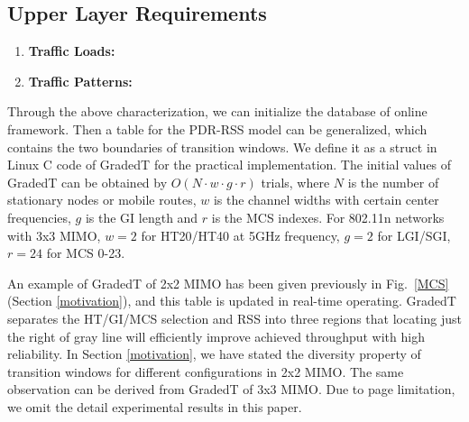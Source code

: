 \documentclass[journal,onecolumn,12pt]{IEEEtran}
\begin{document}
\subsection{Upper Layer Requirements} \label{sect:upper}

\begin{enumerate}
  \item \textbf{Traffic Loads:}
  \item \textbf{Traffic Patterns:}
\end{enumerate}

Through the above characterization, we can initialize the database of online framework. Then a table for the PDR-RSS model can be generalized, which contains the two boundaries of transition windows. We define it as a struct in Linux C code of GradedT for the practical implementation. The initial values of GradedT can be obtained by $\textit{O}(N \cdot w \cdot g \cdot r)$ trials, where $N$ is the number of stationary nodes or mobile routes, $w$ is the channel widths with certain center frequencies, $g$ is the GI length and $r$ is the MCS indexes. For 802.11n networks with 3x3 MIMO, $w=2$ for HT20/HT40 at 5GHz frequency, $g=2$ for LGI/SGI, $r=24$ for MCS 0-23.

An example of GradedT of 2x2 MIMO has been given previously in Fig.~\ref{MCS} (Section \ref{motivation}), and this table is updated in real-time operating. GradedT separates the HT/GI/MCS selection and RSS into three regions that locating just the right of gray line will efficiently improve achieved throughput with high reliability. In Section \ref{motivation}, we have stated the diversity property of transition windows for different configurations in 2x2 MIMO. The same observation can be derived from GradedT of 3x3 MIMO. Due to page limitation, we omit the detail experimental results in this paper.
\end{document}
